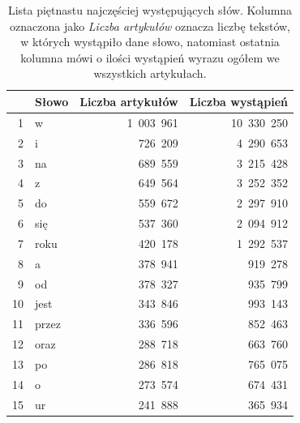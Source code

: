 \documentclass{praca1}
\begin{document}
\begin{table}[!h]
\centering
\caption{Lista piętnastu najczęściej występujących słów. Kolumna oznaczona jako \emph{Liczba artykułów} oznacza liczbę tekstów, w których wystąpiło dane słowo, natomiast ostatnia kolumna mówi o ilości wystąpień wyrazu ogółem we wszystkich artykułach.} 
\begin{tabular}{|r|l|r|r|}
  \hline
 & Słowo & Liczba artykułów & Liczba wystąpień \\ 
  \hline
1 & w & 1\ 003\ 961 & 10\ 330\ 250 \\ 
  2 & i & 726\ 209 & 4\ 290\ 653 \\ 
  3 & na & 689\ 559 & 3\ 215\ 428 \\ 
  4 & z & 649\ 564 & 3\ 252\ 352 \\ 
  5 & do & 559\ 672 & 2\ 297\ 910 \\ 
  6 & się & 537\ 360 & 2\ 094\ 912 \\ 
  7 & roku & 420\ 178 & 1\ 292\ 537 \\ 
  8 & a & 378\ 941 & 919\ 278 \\ 
  9 & od & 378\ 327 & 935\ 799 \\ 
  10 & jest & 343\ 846 & 993\ 143 \\ 
  11 & przez & 336\ 596 & 852\ 463 \\ 
  12 & oraz & 288\ 718 & 663\ 760 \\ 
  13 & po & 286\ 818 & 765\ 075 \\ 
  14 & o & 273\ 574 & 674\ 431 \\ 
  15 & ur & 241\ 888 & 365\ 934 \\ 
   \hline
\end{tabular}
\label{tab:001}
\end{table}
\end{document}
